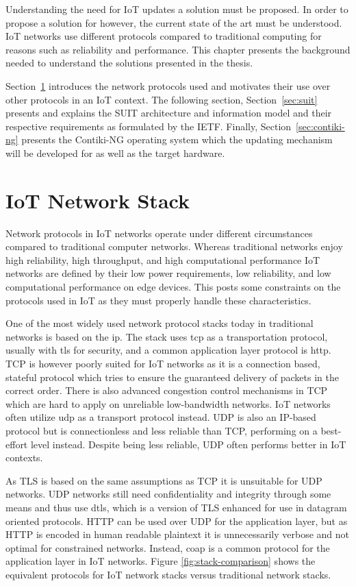 \documentclass[0-thesis.tex]{subfiles}
\begin{document}
Understanding the need for IoT updates a solution must be proposed. In order to propose a
solution for however, the current state of the art must be understood. IoT networks use
different protocols compared to traditional computing for reasons such as reliability and
performance. This chapter presents the background needed to understand the solutions
presented in the thesis. 

Section~\ref{sec:network} introduces the network protocols used and motivates their use
over other protocols in an IoT context. The following section, Section~\ref{sec:suit}
presents and explains the SUIT architecture and information model and their respective
requirements as formulated by the IETF. Finally, Section~\ref{sec:contiki-ng} presents the
Contiki-NG operating system which the updating mechanism will be developed for as well as
the target hardware.

\section{IoT Network Stack}
\label{sec:network}
Network protocols in IoT networks operate under different circumstances compared to
traditional computer networks. Whereas traditional networks enjoy high reliability, high
throughput, and high computational performance IoT networks are defined by their low power
requirements, low reliability, and low computational performance on edge devices. This
posts some constraints on the protocols used in IoT as they must properly handle these
characteristics.

One of the most widely used network protocol stacks today in traditional networks is based
on the \gls{ip}. The stack uses \gls{tcp} as a transportation protocol, usually with
\gls{tls} for security, and a common application layer protocol is \gls{http}. TCP is
however poorly suited for IoT networks as it is a connection based, stateful protocol
which tries to ensure the guaranteed delivery of packets in the correct order. There is
also advanced congestion control mechanisms in TCP which are hard to apply on unreliable
low-bandwidth networks. IoT networks often utilize \gls{udp} as a transport protocol
instead. UDP is also an IP-based protocol but is connectionless and less reliable than
TCP, performing on a best-effort level instead. Despite being less reliable, UDP often
performs better in IoT contexts.

As TLS is based on the same assumptions as TCP it is unsuitable for UDP networks. UDP
networks still need confidentiality and integrity through some means and thus use
\gls{dtls}, which is a version of TLS enhanced for use in datagram oriented protocols.
HTTP can be used over UDP for the application layer, but as HTTP is encoded in human
readable plaintext it is unnecessarily verbose and not optimal for constrained networks.
Instead, \gls{coap} is a common protocol for the application layer in IoT networks. Figure
\ref{fig:stack-comparison} shows the equivalent protocols for IoT network stacks versus
traditional network stacks. 
\end{document}
